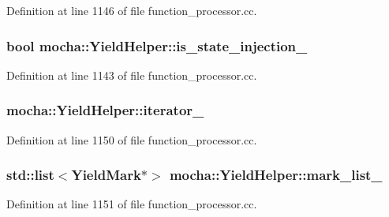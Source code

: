 Definition at line 1146 of file function\_\-processor.cc.

\hypertarget{classmocha_1_1_yield_helper_a536e157628045d35cf7cf3edb0199e85}{
\subsubsection[{is\_\-state\_\-injection\_\-}]{\setlength{\rightskip}{0pt plus 5cm}bool {\bf mocha::YieldHelper::is\_\-state\_\-injection\_\-}}}
\label{classmocha_1_1_yield_helper_a536e157628045d35cf7cf3edb0199e85}


Definition at line 1143 of file function\_\-processor.cc.

\hypertarget{classmocha_1_1_yield_helper_acf3b4f7c427390d530ec386bdbf0aed5}{
\subsubsection[{iterator\_\-}]{ {\bf mocha::YieldHelper::iterator\_\-}}}
\label{classmocha_1_1_yield_helper_acf3b4f7c427390d530ec386bdbf0aed5}


Definition at line 1150 of file function\_\-processor.cc.

\hypertarget{classmocha_1_1_yield_helper_ae6fd6bf0b97adb5f599b59585498d626}{
\subsubsection[{mark\_\-list\_\-}]{\setlength{\rightskip}{0pt plus 5cm}std::list$<${\bf YieldMark}$\ast$$>$ {\bf mocha::YieldHelper::mark\_\-list\_\-}}}
\label{classmocha_1_1_yield_helper_ae6fd6bf0b97adb5f599b59585498d626}


Definition at line 1151 of file function\_\-processor.cc.

